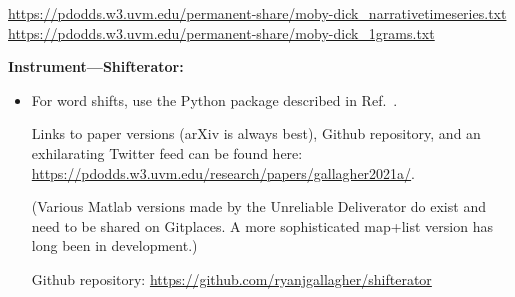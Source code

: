 \url{https://pdodds.w3.uvm.edu/permanent-share/moby-dick_narrativetimeseries.txt}\\
\url{https://pdodds.w3.uvm.edu/permanent-share/moby-dick_1grams.txt}

\textbf{Instrument---Shifterator:}

\begin{itemize}
\item 
  For word shifts,
  use the Python package described in Ref.~\cite{gallagher2021a}.

  Links to paper versions (arXiv is always best),
  Github repository,
  and an
  exhilarating Twitter feed
  can be found here: \url{https://pdodds.w3.uvm.edu/research/papers/gallagher2021a/}.

  (Various Matlab versions made by the Unreliable Deliverator do exist
  and need to be shared on Gitplaces.
 A more sophisticated map+list version has long been in development.)

  
  Github repository:
  \url{https://github.com/ryanjgallagher/shifterator}
\end{itemize}


